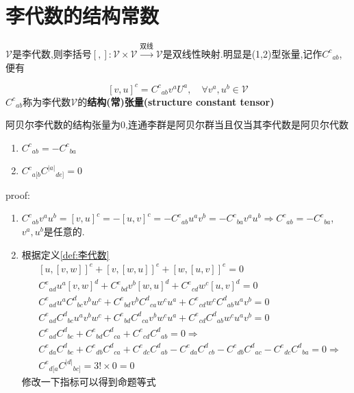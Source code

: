 \documentclass[../main.tex]{subfiles}
\begin{document}
\chapter{李代数的结构常数}
$\mathscr{V}$是李代数,则李括号$[,]:\mathscr{V}\times \mathscr{V} \xrightarrow{\text{双线}} \mathscr{V}$是双线性映射.明显是(1,2)型张量,记作$C^c{}_{ab}$,便有
\begin{definition}
$$[v,u]^c = C^c{}_{ab}v^aU^a,\quad \forall v^a,u^b \in \mathscr{V}$$
$C^c{}_{ab}$称为李代数$\mathscr{V}$的\textbf{结构(常)张量(structure constant tensor)}
\end{definition}
\begin{note}
阿贝尔李代数的结构张量为0,连通李群是阿贝尔群当且仅当其李代数是阿贝尔代数
\end{note}
\begin{theorem}
    \begin{enumerate}
        \item $C^{c}{}_{ab}=-C^{c}{}_{ba}$
        \item $C^{c}{}_{a[b}C^{|a|}{}_{de]} = 0$
    \end{enumerate}
\end{theorem}
proof:\begin{enumerate}
    \item $C^{c}{}_{ab}v^au^b = [v,u]^c = -[u,v]^c = -C^{c}{}_{ab}u^av^b = -C^{c}{}_{ba}v^au^b \Rightarrow C^{c}{}_{ab} = -C^{c}{}_{ba}$,$v^a,u^b$是任意的.
    \item 根据定义\ref{def:李代数}
    \begin{align*}
        &[u, [v, w]]^e + [v, [w, u]]^e + [w, [u, v]]^e = 0\\
        &C^e{}_{ad}u^a[v,w]^d + C^e{}_{bd}v^b[w,u]^d + C^e{}_{cd}w^c[u,v]^d =0\\
        &C^e{}_{ad}u^aC^d{}_{bc}v^bw^c + C^e{}_{bd}v^bC^d{}_{ca}w^cu^a + C^e{}_{cd}w^cC^d{}_{ab}u^av^b =0\\
        &C^e{}_{ad}C^d{}_{bc}u^av^bw^c + C^e{}_{bd}C^d{}_{ca}v^bw^cu^a + C^e{}_{cd}C^d{}_{ab}w^cu^av^b =0\\
        &C^e{}_{ad}C^d{}_{bc} + C^e{}_{bd}C^d{}_{ca} + C^e{}_{cd}C^d{}_{ab} =0\Rightarrow\\
        &C^e{}_{da}C^d{}_{bc} + C^e{}_{db}C^d{}_{ca} + C^e{}_{dc}C^d{}_{ab} -C^e{}_{da}C^d{}_{cb} - C^e{}_{db}C^d{}_{ac} - C^e{}_{dc}C^d{}_{ba} =0 \Rightarrow\\
        &C^e{}_{d[a}C^{|d|}{}_{bc]} = 3!\times0 = 0
    \end{align*}
    修改一下指标可以得到命题等式
\end{enumerate}
\end{document}
